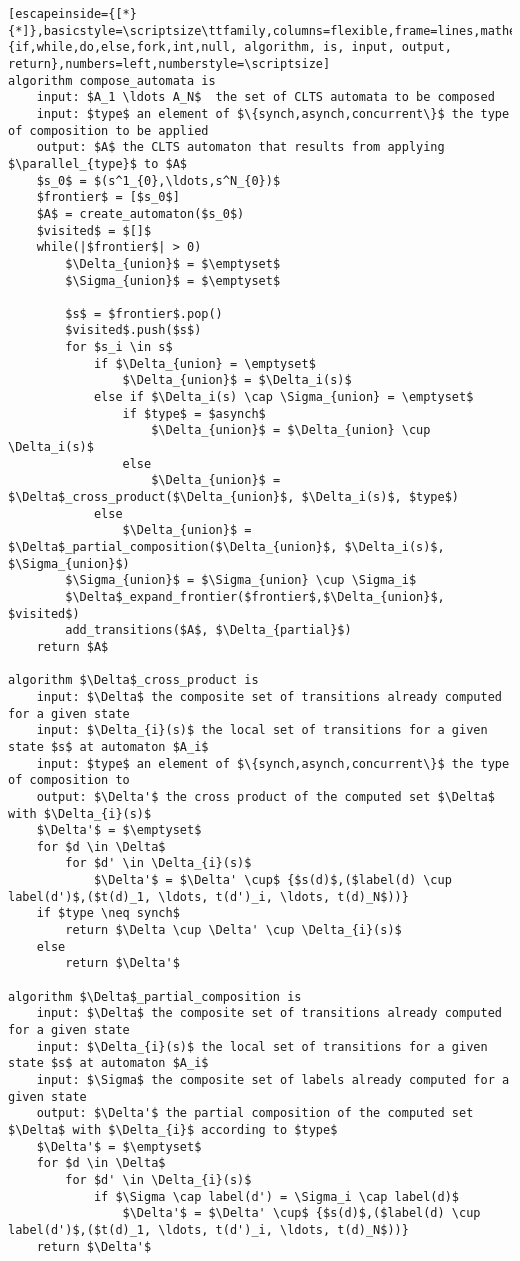 \renewcommand{\ttdefault}{pcr}
\begin{lstlisting}[escapeinside={[*}{*]},basicstyle=\scriptsize\ttfamily,columns=flexible,frame=lines,mathescape=true,xleftmargin=3.0ex,keywordstyle=\textbf,morekeywords={if,while,do,else,fork,int,null, algorithm, is, input, output, return},numbers=left,numberstyle=\scriptsize]
algorithm compose_automata is
	input: $A_1 \ldots A_N$  the set of CLTS automata to be composed
	input: $type$ an element of $\{synch,asynch,concurrent\}$ the type of composition to be applied
	output: $A$ the CLTS automaton that results from applying $\parallel_{type}$ to $A$
	$s_0$ = $(s^1_{0},\ldots,s^N_{0})$
	$frontier$ = [$s_0$]
	$A$ = create_automaton($s_0$)
	$visited$ = $[]$
	while(|$frontier$| > 0)
		$\Delta_{union}$ = $\emptyset$
		$\Sigma_{union}$ = $\emptyset$		
		
		$s$ = $frontier$.pop()
		$visited$.push($s$)
		for $s_i \in s$ 
			if $\Delta_{union} = \emptyset$
				$\Delta_{union}$ = $\Delta_i(s)$
			else if $\Delta_i(s) \cap \Sigma_{union} = \emptyset$		
				if $type$ = $asynch$
					$\Delta_{union}$ = $\Delta_{union} \cup \Delta_i(s)$
				else
					$\Delta_{union}$ = $\Delta$_cross_product($\Delta_{union}$, $\Delta_i(s)$, $type$)
			else
				$\Delta_{union}$ = $\Delta$_partial_composition($\Delta_{union}$, $\Delta_i(s)$, $\Sigma_{union}$)
		$\Sigma_{union}$ = $\Sigma_{union} \cup \Sigma_i$
		$\Delta$_expand_frontier($frontier$,$\Delta_{union}$, $visited$)				
		add_transitions($A$, $\Delta_{partial}$)
	return $A$

algorithm $\Delta$_cross_product is
	input: $\Delta$ the composite set of transitions already computed for a given state
	input: $\Delta_{i}(s)$ the local set of transitions for a given state $s$ at automaton $A_i$
	input: $type$ an element of $\{synch,asynch,concurrent\}$ the type of composition to	
	output: $\Delta'$ the cross product of the computed set $\Delta$ with $\Delta_{i}(s)$
	$\Delta'$ = $\emptyset$
	for $d \in \Delta$
		for $d' \in \Delta_{i}(s)$
			$\Delta'$ = $\Delta' \cup$ {$s(d)$,($label(d) \cup label(d')$,($t(d)_1, \ldots, t(d')_i, \ldots, t(d)_N$))}
	if $type \neq synch$
		return $\Delta \cup \Delta' \cup \Delta_{i}(s)$
	else
		return $\Delta'$
	
algorithm $\Delta$_partial_composition is
	input: $\Delta$ the composite set of transitions already computed for a given state
	input: $\Delta_{i}(s)$ the local set of transitions for a given state $s$ at automaton $A_i$
	input: $\Sigma$ the composite set of labels already computed for a given state		
	output: $\Delta'$ the partial composition of the computed set $\Delta$ with $\Delta_{i}$ according to $type$
	$\Delta'$ = $\emptyset$
	for $d \in \Delta$
		for $d' \in \Delta_{i}(s)$
			if $\Sigma \cap label(d') = \Sigma_i \cap label(d)$
				$\Delta'$ = $\Delta' \cup$ {$s(d)$,($label(d) \cup label(d')$,($t(d)_1, \ldots, t(d')_i, \ldots, t(d)_N$))}
	return $\Delta'$
				

\end{lstlisting}